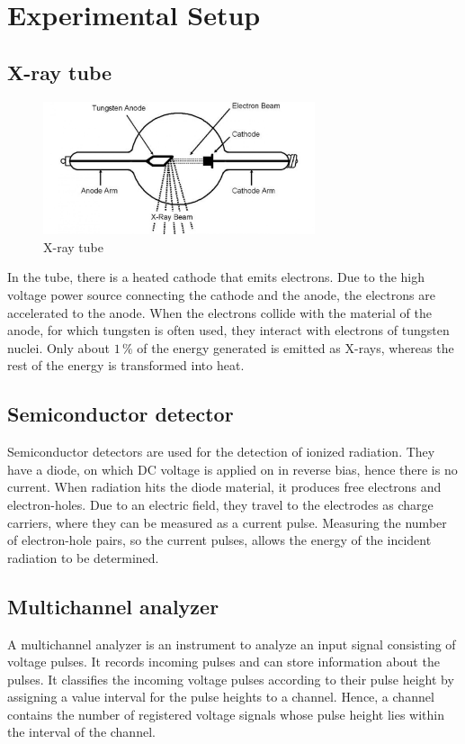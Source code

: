 \chapter{Experimental Setup}
\section{X-ray tube}
\begin{figure}[H]
    \centering
    \includegraphics[width=80mm,scale=0.35]{MAX/include/X-ray tube.PNG}
    \caption{X-ray tube}
    \label{fig:X-ray tube}
\end{figure}
In the tube, there is a heated cathode that emits electrons. Due to the high voltage power source connecting the cathode and the anode, the electrons are accelerated to the anode. When the electrons collide with the material of the anode, for which tungsten is often used, they interact with electrons of tungsten nuclei. Only about $1\,\%$ of the energy generated is emitted as X-rays, whereas the rest of the energy is transformed into heat.

\section{Semiconductor detector}
Semiconductor detectors are used for the detection of ionized radiation. They have a diode, on which DC voltage is applied on in reverse bias, hence there is no current. When radiation hits the diode material, it produces free electrons and electron-holes. Due to an electric field, they travel to the electrodes as charge carriers, where they can be measured as a current pulse. Measuring the number of electron-hole pairs, so the current pulses, allows the energy of the incident radiation to be determined.


\section{Multichannel analyzer}
A multichannel analyzer is an instrument to analyze an input signal consisting of voltage pulses. It records incoming pulses and can store information about the pulses. It classifies the incoming voltage pulses according to their pulse height by assigning a value interval for the pulse heights to a channel. Hence, a channel contains the number of registered voltage signals whose pulse height lies within the interval of the channel.